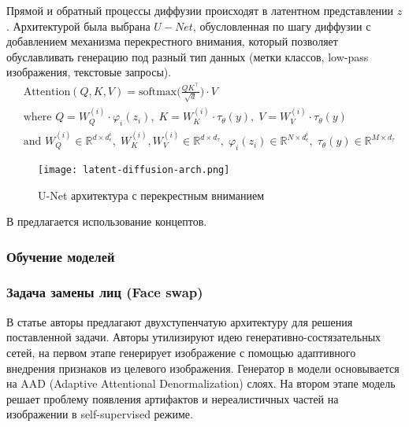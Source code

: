 \par
Прямой и обратный процессы диффузии происходят в латентном представлении $z$. Архитектурой была выбрана $U-Net$, обусловленная по шагу диффузии с добавлением механизма перекрестного внимания, который позволяет обуславливать генерацию под разный тип данных (метки классов, low-pass изображения, текстовые запросы). 
\[
    \begin{aligned}
    &\text{Attention}(Q, K, V) = \text{softmax}\Big(\frac{QK^\top}{\sqrt{d}}\Big) \cdot V \\
    &\text{where }Q = W^{(i)}_Q \cdot \varphi_i(z_i),\;
    K = W^{(i)}_K \cdot \tau_\theta(y),\;
    V = W^{(i)}_V \cdot \tau_\theta(y) \\
    &\text{and }
    W^{(i)}_Q \in \mathbb{R}^{d \times d^i_\epsilon},\;
    W^{(i)}_K, W^{(i)}_V \in \mathbb{R}^{d \times d_\tau},\;
    \varphi_i(z_i) \in \mathbb{R}^{N \times d^i_\epsilon},\;
    \tau_\theta(y) \in \mathbb{R}^{M \times d_\tau}
    \end{aligned}
\]

\begin{figure}[H]
    \centering
    \texttt{[image: latent-diffusion-arch.png]}
    \caption{U-Net архитектура с перекрестным вниманием}
    \label{fig:latent-diffusion-arch}
\end{figure} 
В \cite{ruiz2023dreambooth} предлагается использование концептов. 




\subsubsection{Обучение моделей}
\par

\subsubsection{Задача замены лиц (Face swap)}

\par
В статье \cite{li2020faceshifter} авторы предлагают двухступенчатую архитектуру для решения поставленной задачи. Авторы утилизируют идею генеративно-состязательных сетей, на первом этапе генерирует изображение с помощью адаптивного внедрения признаков из целевого изображения. Генератор в модели основывается на AAD (Adaptive Attentional Denormalization) слоях. На втором этапе модель решает проблему появления артифактов и нереалистичных частей на изображении в self-supervised режиме.  

